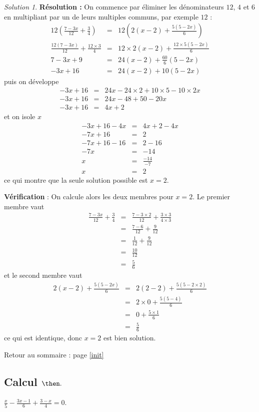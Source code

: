 \documentclass[14pt]{article}
\theoremstyle{remark}
\newtheorem*{sol}{Solution}
\newcounter{n}
\renewcommand{\it}{Retour au sommaire : page \ref{init}
	\subsection{Calcul $ \mathbf{ \then}.$}\label{\then} \stepcounter{n} }
\theoremstyle{plain}
\begin{document}
\begin{sol}
\textbf{Résolution :} On commence par éliminer les dénominateurs $12$, $4$ et $6$ en multipliant par un de leurs multiples communs, par exemple $12$ : 
\begin{eqnarray*}
12\left(\frac{7-3x}{12} + \frac34\right) &=&12\left(2(x-2) + \frac{5(5-2x)}6\right)\\
 \frac{12(7-3x)}{12}+\frac{12\times3}4 &=& 12\times2(x-2)
+\frac{12\times5(5-2x)}6\\
7-3x + 9 &=& 24(x-2) + \frac{60}6(5-2x)\\
-3x+16 &=& 24(x-2) + 10(5-2x)
\end{eqnarray*} puis on développe
\begin{eqnarray*} -3x+16 &=& 24x-24\times 2 + 10\times 5-10\times 2x\\
-3x+16 &=& 24x-48+50 -20 x \\
-3x+16 &=& 4x+2 
\end{eqnarray*}et on isole $x$
\begin{eqnarray*}
-3x+16-4x &=& 4x+2-4x \\
-7x+16 &=& 2 \\
-7x+16-16 &=& 2-16\\
-7x &=& -14\\
x &=& \frac{-14}{-7}\\
x&=& 2
\end{eqnarray*}
ce qui montre que la seule solution possible est $x=2$. 

\textbf{Vérification} : On calcule alors les deux membres pour $x=2$. Le premier membre vaut 
\begin{eqnarray*}\frac{7-3x}{12} + \frac34&=& 
\frac{7-3\times 2}{12}+\frac{3\times3}{4\times3}\\
&=& \frac{7-6}{12}+\frac{9}{12}\\
&=& \frac{1}{12}+\frac{9}{12} \\
&=& \frac{10}{12}\\
&=& \frac56
\end{eqnarray*}
et le second membre vaut 
\begin{eqnarray*}2(x-2)+\frac{5(5-2x)}6 &=& 
2(2-2) + \frac{5(5-2\times2)}6\\
&=& 2\times 0 + \frac{5(5-4)}6 \\
&=& 0 + \frac{5\times 1}6 \\
&=& \frac56
\end{eqnarray*} ce qui est identique, donc $x=2$ est bien solution.
\end{sol}
\it $\frac{x}5 - \frac{3x-1}6 + \frac{3-x}4 = 0$.
\end{document}
